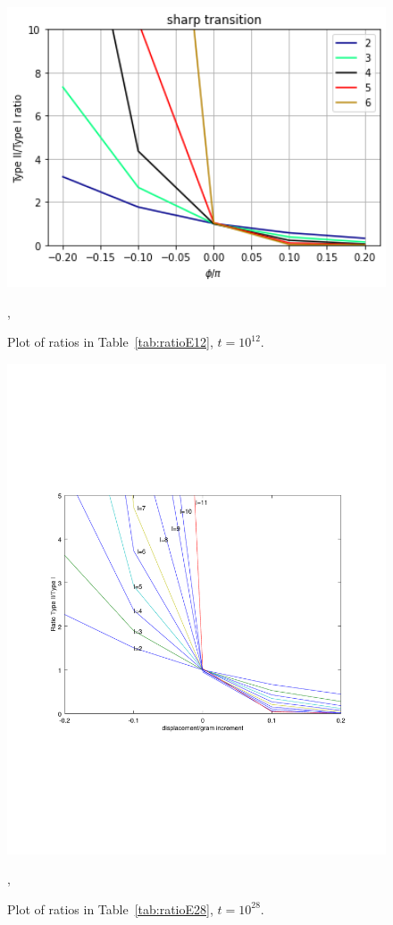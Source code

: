 \documentclass[twoside]{article}
\begin{document}
\begin{figure}
\centering
\includegraphics[width=1.0\textwidth]{ratioE12.png}
\caption[]{ 
 Plot of  ratios in  Table~\ref{tab:ratioE12},  $t = 10^{12}$.
 }
\vspace{1mm}, 
\label{ratioE12}
\end{figure}

\begin{figure}
\includegraphics[width=1.0\textwidth]{typeIIratio.pdf}
\caption[]{ 
 Plot of  ratios in  Table~\ref{tab:ratioE28},  $t = 10^{28}$.
 }
\vspace{1mm}, 
\label{ratioE28}
\end{figure}
\end{document}

